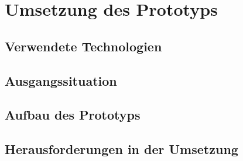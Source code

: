 \chapter{Umsetzung des Prototyps}

\section{Verwendete Technologien}

\section{Ausgangssituation}

\section{Aufbau des Prototyps}

\section{Herausforderungen in der Umsetzung}